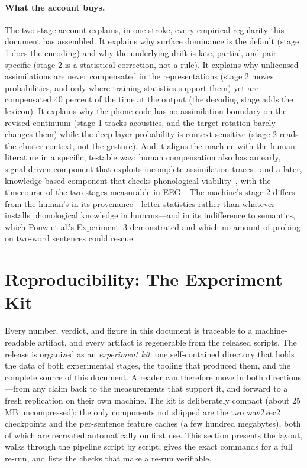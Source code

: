 \documentclass[11pt,a4paper]{article}
\begin{document}
\paragraph{What the account buys.}
The two-stage account explains, in one stroke, every empirical
regularity this document has assembled. It explains why surface
dominance is the default (stage 1 does the encoding) and why the
underlying drift is late, partial, and pair-specific (stage 2 is a
statistical correction, not a rule). It explains why unlicensed
assimilations are never compensated in the representations (stage 2
moves probabilities, and only where training statistics support them)
yet are compensated 40 percent of the time at the output (the decoding
stage adds the lexicon). It explains why the phone code has no assimilation
boundary on the revised continuum (stage 1 tracks acoustics, and the
target rotation barely changes them) while the deep-layer probability
is context-sensitive (stage 2 reads the cluster context, not the
gesture). And it aligns the machine with the human
literature in a specific, testable way: human compensation also has an
early, signal-driven component that exploits incomplete-assimilation
traces~\citep{gaow2002} and a later, knowledge-based component that
checks phonological viability~\citep{gaskell1996,mitterer2003}, with
the timecourse of the two stages measurable in
EEG~\citep{mitterer2003}. The machine's stage 2 differs from the
human's in its provenance---letter statistics rather than whatever
installs phonological knowledge in humans---and in its indifference to
semantics, which Pouw et al.'s Experiment~3 demonstrated and which no
amount of probing on two-word sentences could rescue.

\needspace{0.25\textheight}
\section{Reproducibility: The Experiment Kit}\label{sec:repro}

Every number, verdict, and figure in this document is traceable to a
machine-readable artifact, and every artifact is regenerable from the
released scripts. The release is organized as an \emph{experiment
kit}: one self-contained directory that holds the data of both
experimental stages, the tooling that produced them, and the complete
source of this document. A reader can therefore move in both
directions---from any claim back to the measurements that support it,
and forward to a fresh replication on their own machine. The kit is
deliberately compact (about 25\,MB uncompressed): the only components
not shipped are the two wav2vec2 checkpoints and the per-sentence
feature caches (a few hundred megabytes), both of which are recreated
automatically on first use. This section presents the layout, walks
through the pipeline script by script, gives the exact commands for a
full re-run, and lists the checks that make a re-run verifiable.
\end{document}
